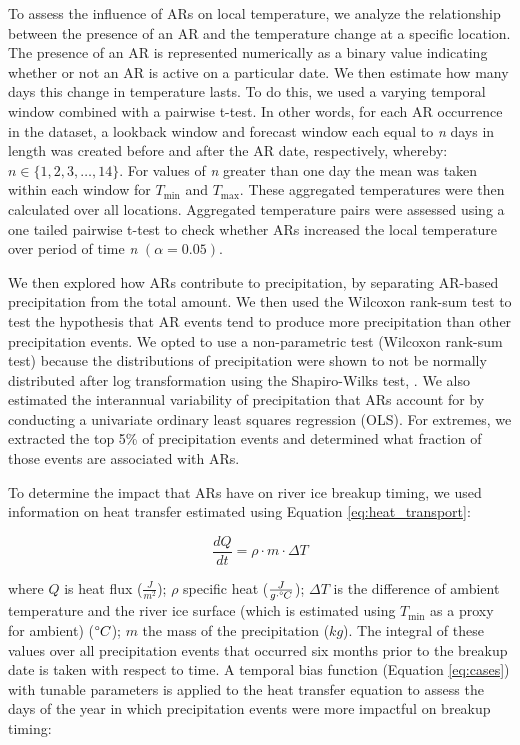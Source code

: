 \documentclass[12pts,draft]{AR_analysis_}
\begin{document}
To assess the influence of ARs on local temperature, we analyze 
the relationship between the presence of an AR and the temperature 
change at a specific location. The presence of an AR is represented 
numerically as a binary value indicating whether or not an AR is 
active on a particular date. We then estimate how many days this 
change in temperature lasts. To do this, we used a
varying temporal window combined with a pairwise t-test. In other 
words, for each
AR occurrence in the dataset, a lookback window and forecast 
window each equal to \emph{n}
days in length was created before and after the AR date, respectively,
whereby: $ n \in \{1, 2, 3, \ldots, 14\}$.
For values of \emph{n} greater than one day the mean was 
taken within each window
for $T_{\text{min}}$ and $T_{\text{max}}$. These aggregated 
temperatures were then
calculated over all locations. Aggregated temperature pairs 
were assessed using a one tailed pairwise t-test to check
whether ARs increased the local temperature over period of 
time \emph{n} $(\alpha =
0.05)$. 

We then explored how ARs contribute to precipitation, by
separating AR-based precipitation from the total amount. We 
then used the Wilcoxon rank-sum test \cite{Rey2011} to test 
the hypothesis 
that AR events tend to produce more precipitation than other
precipitation events. We opted to use a non-parametric 
test (Wilcoxon rank-sum test) 
because the distributions of precipitation were shown to
not be normally distributed after log transformation using the
Shapiro-Wilks test, \cite{shapiro_wilk_test}. We also estimated
the interannual variability of precipitation that ARs account for by
conducting a univariate ordinary least squares regression (OLS). 
For extremes, we extracted the top 5\% of precipitation events and determined 
what fraction of those events are associated with ARs. 

To determine the impact that ARs have on river ice breakup timing, 
we used information on heat transfer estimated 
using Equation \ref{eq:heat_transport}:

\begin{equation}
\frac{dQ}{dt} = \rho \cdot m \cdot \Delta T 
	\label{eq:heat_transport}
\end{equation}

\noindent where $Q$ is heat flux ($\frac{J}{m^2}$); $\rho$ specific heat 
($\frac{J}{g \cdot \degree C}$); $\Delta T$ is the difference of 
ambient temperature and the river ice surface (which is estimated 
using $T_{\text{min}}$ as a proxy for ambient) ($\degree C$); $m$ 
the mass of the precipitation ($kg$). The integral of these values
over all precipitation events that occurred six months prior to the
breakup date is taken with respect to time. A temporal bias function
(Equation \ref{eq:cases})
with tunable parameters is applied to the heat transfer equation to assess 
the days of the year in which  precipitation events were more 
impactful on breakup timing:
\end{document}
